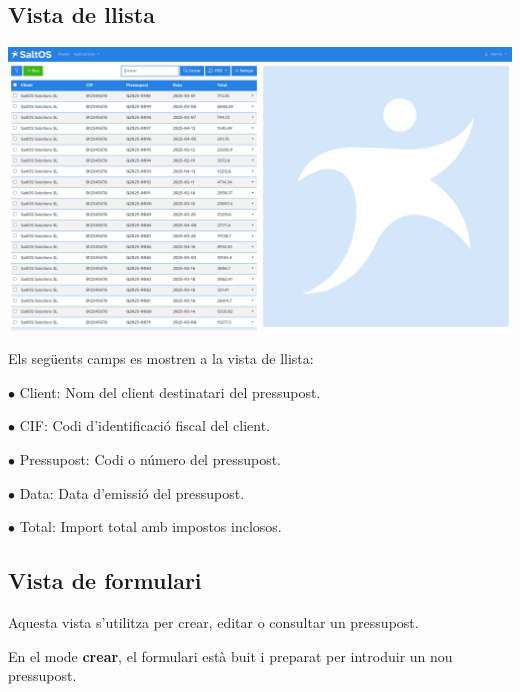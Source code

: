 \documentclass[a4paper]{article}
\begin{document}
\hypertarget{toc73}{}
\subsection{Vista de llista}

\begin{center}\includegraphics[width=1\textwidth]{../ujest/snaps/test-screenshots-js-screenshots-crm-quotes-list-ca-es-1-snap.png}\end{center}

Els següents camps es mostren a la vista de llista:

\begin{compactitem}
\item[\color{myblue}$\bullet$] Client: Nom del client destinatari del pressupost.
\item[\color{myblue}$\bullet$] CIF: Codi d'identificació fiscal del client.
\item[\color{myblue}$\bullet$] Pressupost: Codi o número del pressupost.
\item[\color{myblue}$\bullet$] Data: Data d'emissió del pressupost.
\item[\color{myblue}$\bullet$] Total: Import total amb impostos inclosos.
\end{compactitem}

\hypertarget{toc74}{}
\subsection{Vista de formulari}

Aquesta vista s'utilitza per crear, editar o consultar un pressupost.

En el mode \textbf{crear}, el formulari està buit i preparat per introduir un nou pressupost.
\end{document}
